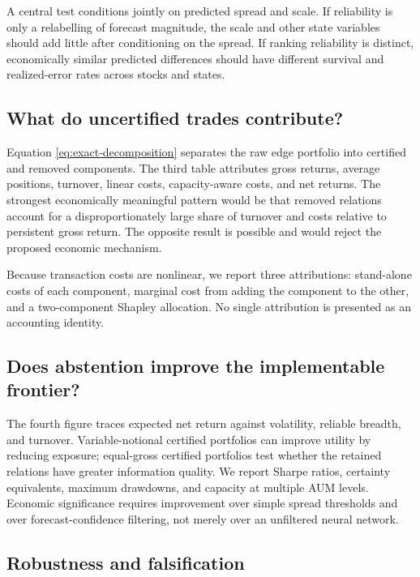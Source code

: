 A central test conditions jointly on predicted spread and scale. If reliability is only a relabelling of forecast magnitude, the scale and other state variables should add little after conditioning on the spread. If ranking reliability is distinct, economically similar predicted differences should have different survival and realized-error rates across stocks and states.

\subsection{What do uncertified trades contribute?}

Equation \eqref{eq:exact-decomposition} separates the raw edge portfolio into certified and removed components. The third table attributes gross returns, average positions, turnover, linear costs, capacity-aware costs, and net returns. The strongest economically meaningful pattern would be that removed relations account for a disproportionately large share of turnover and costs relative to persistent gross return. The opposite result is possible and would reject the proposed economic mechanism.

Because transaction costs are nonlinear, we report three attributions: stand-alone costs of each component, marginal cost from adding the component to the other, and a two-component Shapley allocation. No single attribution is presented as an accounting identity.

\subsection{Does abstention improve the implementable frontier?}

The fourth figure traces expected net return against volatility, reliable breadth, and turnover. Variable-notional certified portfolios can improve utility by reducing exposure; equal-gross certified portfolios test whether the retained relations have greater information quality. We report Sharpe ratios, certainty equivalents, maximum drawdowns, and capacity at multiple AUM levels. Economic significance requires improvement over simple spread thresholds and over forecast-confidence filtering, not merely over an unfiltered neural network.

\subsection{Robustness and falsification}

